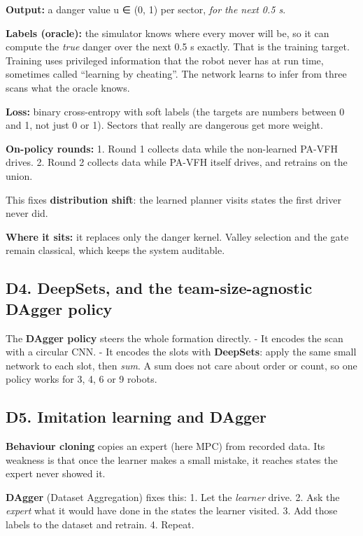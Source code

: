 \documentclass[
  10.5pt,
  a4paper,
]{article}
\begin{document}
\textbf{Output:} a danger value u ∈ (0, 1) per sector, \emph{for the
next 0.5 s}.

\textbf{Labels (oracle):} the simulator knows where every mover will be,
so it can compute the \emph{true} danger over the next 0.5 s exactly.
That is the training target. Training uses privileged information that
the robot never has at run time, sometimes called ``learning by
cheating''. The network learns to infer from three scans what the oracle
knows.

\textbf{Loss:} binary cross-entropy with soft labels (the targets are
numbers between 0 and 1, not just 0 or 1). Sectors that really are
dangerous get more weight.

\textbf{On-policy rounds:} 1. Round 1 collects data while the
non-learned PA-VFH drives. 2. Round 2 collects data while PA-VFH itself
drives, and retrains on the union.

This fixes \textbf{distribution shift}: the learned planner visits
states the first driver never did.

\textbf{Where it sits:} it replaces only the danger kernel. Valley
selection and the gate remain classical, which keeps the system
auditable.

\hypertarget{d4.-deepsets-and-the-team-size-agnostic-dagger-policy}{%
\subsection{D4. DeepSets, and the team-size-agnostic DAgger
policy}\label{d4.-deepsets-and-the-team-size-agnostic-dagger-policy}}

The \textbf{DAgger policy} steers the whole formation directly. - It
encodes the scan with a circular CNN. - It encodes the slots with
\textbf{DeepSets}: apply the same small network to each slot, then
\emph{sum}. A sum does not care about order or count, so one policy
works for 3, 4, 6 or 9 robots.

\hypertarget{d5.-imitation-learning-and-dagger}{%
\subsection{D5. Imitation learning and
DAgger}\label{d5.-imitation-learning-and-dagger}}

\textbf{Behaviour cloning} copies an expert (here MPC) from recorded
data. Its weakness is that once the learner makes a small mistake, it
reaches states the expert never showed it.

\textbf{DAgger} (Dataset Aggregation) fixes this: 1. Let the
\emph{learner} drive. 2. Ask the \emph{expert} what it would have done
in the states the learner visited. 3. Add those labels to the dataset
and retrain. 4. Repeat.
\end{document}
